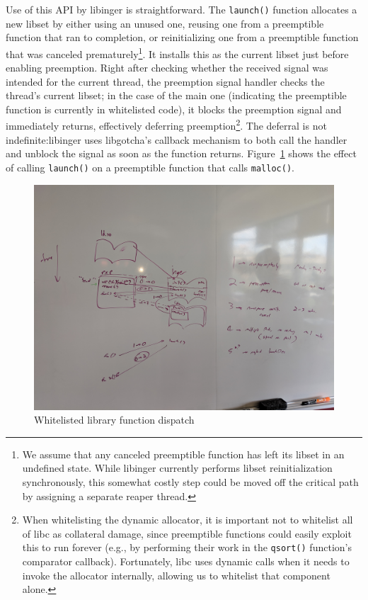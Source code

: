 Use of this API by libinger is straightforward.  The \texttt{launch()} function
allocates a new libset by either using an unused one, reusing one from a preemptible
function that ran to completion, or reinitializing one from a preemptible function
that was canceled prematurely\footnote{We assume that any canceled preemptible
function has left its libset in an undefined state.  While libinger currently
performs libset reinitialization synchronously, this somewhat costly step could be
moved off the critical path by assigning a separate reaper thread.}.  It installs
this as the current libset just before enabling preemption.  Right after checking
whether the received signal was intended for the current thread, the preemption
signal handler checks the thread's current libset; in the case of the main one
(indicating the preemptible function is currently in whitelisted code), it blocks the
preemption signal and immediately returns, effectively deferring
preemption\footnote{When whitelisting the dynamic allocator, it is important not to
whitelist all of libc as collateral damage, since preemptible functions could easily
exploit this to run forever (e.g., by performing their work in the \texttt{qsort()}
function's comparator callback).  Fortunately, libc uses dynamic calls when it needs
to invoke the allocator internally, allowing us to whitelist that component alone.}.
The deferral is not indefinite:\@ libinger uses libgotcha's callback mechanism to
both call the handler and unblock the signal as soon as the function returns.
Figure~\ref{fig:callwhitelist} shows the effect of calling \texttt{launch()} on a
preemptible function that calls \texttt{malloc()}.

\begin{figure}
\includegraphics[width=\columnwidth]{figs/calltree}
\caption{Whitelisted library function dispatch}
\label{fig:callwhitelist}
\end{figure}

